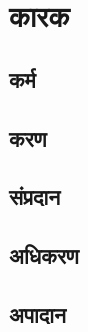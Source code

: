 \documentclass{book}
\begin{document}
\chapter{कारक}

\section{कर्म} 
\section{करण} 
\section{संप्रदान} 
\section{अधिकरण} 
\section{अपादान} 
\end{document}
